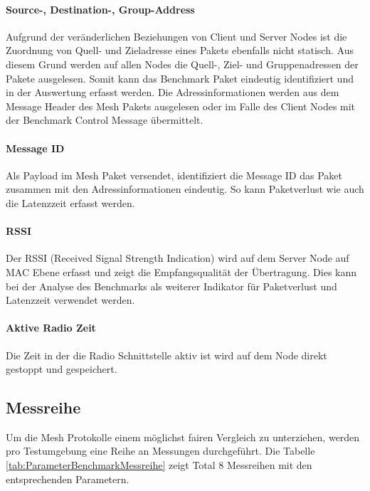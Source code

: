 \paragraph{Source-, Destination-, Group-Address}
Aufgrund der veränderlichen Beziehungen von Client und Server Nodes ist die Zuordnung von Quell- und Zieladresse eines Pakets ebenfalls nicht statisch. Aus diesem Grund werden auf allen Nodes die Quell-, Ziel- und Gruppenadressen der Pakete ausgelesen. 
Somit kann das Benchmark Paket eindeutig identifiziert und in der Auswertung erfasst werden.
Die Adressinformationen werden aus dem Message Header des Mesh Pakets ausgelesen oder im Falle des Client Nodes mit der Benchmark Control Message übermittelt.

\paragraph{Message ID}
Als Payload im Mesh Paket versendet, identifiziert die Message ID das Paket zusammen mit den Adressinformationen eindeutig. So kann Paketverlust wie auch die Latenzzeit erfasst werden.

\paragraph{RSSI}
Der RSSI (Received Signal Strength Indication) wird auf dem Server Node auf MAC Ebene erfasst und zeigt die Empfangsqualität der Übertragung. Dies kann bei der Analyse des Benchmarks als weiterer Indikator für Paketverlust und Latenzzeit verwendet werden.

\paragraph{Aktive Radio Zeit}
Die Zeit in der die Radio Schnittstelle aktiv ist wird auf dem Node direkt gestoppt und gespeichert.


\subsection{Messreihe}\label{subsec:Messreihe}
Um die Mesh Protokolle einem möglichst fairen Vergleich zu unterziehen, werden pro Testumgebung eine Reihe an Messungen durchgeführt. Die Tabelle \ref{tab:ParameterBenchmarkMessreihe} zeigt Total 8 Messreihen mit den entsprechenden Parametern.


